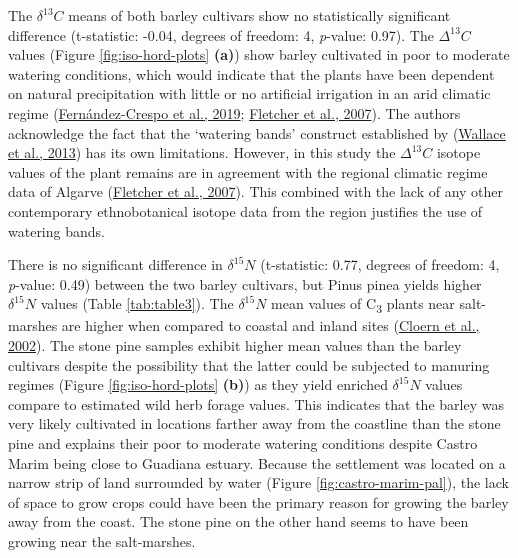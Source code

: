 \documentclass[preprint, 3p, authoryear]{elsarticle} %
\begin{document}
The \(\delta ^{13}C\) means of both barley cultivars show no statistically significant difference (t-statistic: -0.04, degrees of freedom: 4, \emph{p}-value: 0.97). The \(\Delta ^{13}C\) values (Figure \ref{fig:iso-hord-plots} \textbf{(a)}) show barley cultivated in poor to moderate watering conditions, which would indicate that the plants have been dependent on natural precipitation with little or no artificial irrigation in an arid climatic regime (\protect\hyperlink{ref-fernandez-crespo_etal19}{Fernández-Crespo et al., 2019}; \protect\hyperlink{ref-fletcher_etal07}{Fletcher et al., 2007}). The authors acknowledge the fact that the `watering bands' construct established by (\protect\hyperlink{ref-wallace_etal13}{Wallace et al., 2013}) has its own limitations. However, in this study the \(\Delta ^{13}C\) isotope values of the plant remains are in agreement with the regional climatic regime data of Algarve (\protect\hyperlink{ref-fletcher_etal07}{Fletcher et al., 2007}). This combined with the lack of any other contemporary ethnobotanical isotope data from the region justifies the use of watering bands.

There is no significant difference in \(\delta ^{15}N\) (t-statistic: 0.77, degrees of freedom: 4, \emph{p}-value: 0.49) between the two barley cultivars, but Pinus pinea yields higher \(\delta ^{15}N\) values (Table \ref{tab:table3}). The \(\delta ^{15}N\) mean values of C\textsubscript{3} plants near salt-marshes are higher when compared to coastal and inland sites (\protect\hyperlink{ref-cloern_etal02}{Cloern et al., 2002}). The stone pine samples exhibit higher mean values than the barley cultivars despite the possibility that the latter could be subjected to manuring regimes (Figure \ref{fig:iso-hord-plots} \textbf{(b)}) as they yield enriched \(\delta ^{15}N\) values compare to estimated wild herb forage values. This indicates that the barley was very likely cultivated in locations farther away from the coastline than the stone pine and explains their poor to moderate watering conditions despite Castro Marim being close to Guadiana estuary. Because the settlement was located on a narrow strip of land surrounded by water (Figure \ref{fig:castro-marim-pal}), the lack of space to grow crops could have been the primary reason for growing the barley away from the coast. The stone pine on the other hand seems to have been growing near the salt-marshes.

\begingroup\fontsize{7.5}{9.5}\selectfont
\end{document}
